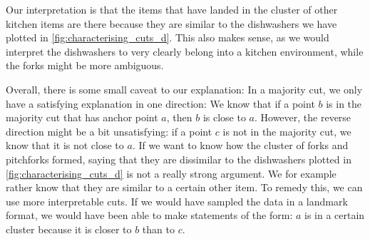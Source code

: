 Our interpretation is that the items that have landed in the cluster of other kitchen items are there because they are similar to
the dishwashers we have plotted in \autoref{fig:characterising_cuts_d}. This also makes sense, as we would interpret the dishwashers to very clearly belong into a kitchen environment, while the forks might be more ambiguous.

Overall, there is some small caveat to our explanation: In a majority cut, we only have a satisfying explanation in one direction: We know that if a point $b$ is in the majority cut that has anchor point $a$, 
then $b$ is close to $a$. However, the reverse direction might be a bit unsatisfying: if a point $c$ is not in the majority cut, we know that it is not close to $a$. 
If we want to know how the cluster of forks and pitchforks formed, saying that they are dissimilar to the dishwashers plotted in \autoref{fig:characterising_cuts_d} is not a really strong argument.
We for example rather know that they are similar to a certain other item. To remedy this, we can use more interpretable cuts. If we would have sampled the data in a landmark format, we would have 
been able to make statements of the form: $a$ is in a certain cluster because it is closer to $b$ than to $c$.



